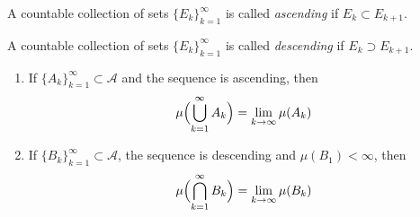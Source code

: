 \begin{definition}
    A countable collection of sets $\{E_k\}_{k=1}^\infty$ is called
    \textit{ascending} if $E_k \subset E_{k+1}$.
\end{definition}
\begin{definition}
    A countable collection of sets $\{E_k\}_{k=1}^\infty$ is called
    \textit{descending} if $E_k \supset E_{k+1}$.
\end{definition}

\begin{theorem}
    \label{the:continuityOfMeasure}
    \item{} %
    \begin{enumerate}
        \item {
            If $\{A_k\}_{k=1}^\infty \subset \mathcal{A}$ and the sequence is ascending,
            then
            \[
                \mu\Bigl(\bigcup_{k=1}^\infty A_k\Bigr) = \lim_{k \to \infty} \mu(A_k)
            \]
        }
        \item {
            If $\{B_k\}_{k=1}^\infty \subset \mathcal{A}$, the sequence is descending and $\mu(B_1) < \infty$,
            then
            \[
                \mu\Bigl(\bigcap_{k=1}^\infty B_k\Bigr) = \lim_{k \to \infty} \mu(B_k)
            \]
        }
    \end{enumerate}
\end{theorem}
